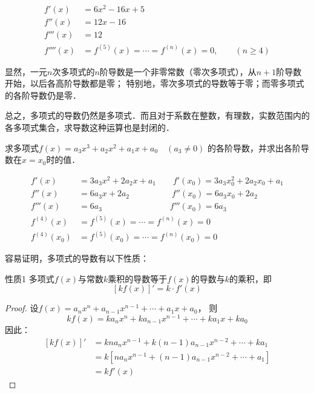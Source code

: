     \begin{solution}
\[\begin{split}
    f' (x) &=6x^2-16x+5\\
        f'' (x) &=12x-16\\
        f''' (x) &=12\\
        f'''' (x) &=f^{(5)}(x)=\cdots =f^{(n)}(x)=0,\qquad (n\ge 4)
\end{split}\]
    \end{solution}    

    显然，一元$n$次多项式的$n$阶导数是一个非零常数（零次多项式），从$n+1$阶导数开始，以后各高阶导数都是零；
    特别地，零次多项式的导数等于零；而零多项式的各阶导数仍是零．

    总之，多项式的导数仍然是多项式．而且对于系数在整数，有理数，实数范围内的各多项式集合，求导数这种运算也是封闭的．

 
    \begin{example}
求多项式$f (x) =a_3x^3+a_2x^2+a_1x+a_0\quad  (a_3\ne 0)$ 的各阶导数，并求出各阶导数在$x=x_0$时的值．          
    \end{example}           
         
    \begin{solution}
\[\begin{split}
 f'(x)&=3a_3x^2+2a_2x+a_1\qquad 
    f' (x_0) =3a_3 x^2_0 +2a_2x_0+a_1\\
    f'' (x) &=6a_3x+2a_2\qquad \qquad \quad 
    f'' (x_0) =6a_3x_0+2a_2\\
    f''' (x) &=6a_3\qquad \qquad \qquad \qquad 
     f''' (x_0 ) =6a_3\\
     f^{(4)} (x)&=f^{(5)}(x)=\cdots =f^{(n)}(x)=0\\
     f^{(4)}  (x_0)&=f^{(5)}(x_0)=\cdots =f^{(n)}(x_0)=0 
\end{split}\] 
    \end{solution} 

容易证明，多项式的导数有以下性质：

\begin{blk}{性质1}
    多项式$f(x)$与常数$k$乘积的导数等于$f(x)$的导数与$k$的乘积，即
\[[kf (x) ]'=k\cdot f' (x) \]
\end{blk}   

\begin{proof}
设$f(x)=a_nx^n+a_{n-1}x^{n-1}+\cdots+a_1x+a_0$，
则
\[kf(x)=ka_nx^n+ka_{n-1}x^{n-1}+\cdots+ka_1x+ka_0\]
因此：
\[\begin{split}
    [kf(x)]'&=kna_nx^{n-1}+k(n - 1)a_{n-1}x^{n-2}+\cdots+ka_1\\
&=k \left[na_nx^{n-1}+(n - 1)a_{n-1}x^{n-2}+\cdots+a_1\right]\\
&=kf' (x) 
\end{split}\]
\end{proof}

